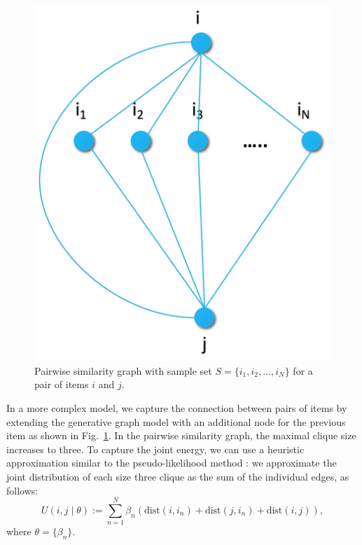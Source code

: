 \begin{figure}
\centerline{
  \includegraphics[scale=.2]{i2i_joined.png}}

\caption[]{Pairwise similarity graph with sample set $S=\{i_1,i_2,...,i_{N}\}$ for a pair of items $i$ and $j$.}
\label{fig:join}
\end{figure}


In a more complex model, we capture the connection between pairs of items by extending the generative graph model with an additional node for the previous item as shown in Fig.~\ref{fig:join}.  In the pairwise similarity graph, the maximal clique size increases to three. To capture the joint energy, we can use a heuristic approximation similar to the pseudo-likelihood method \cite{besag1975statistical}: we approximate the joint distribution of each size three clique as the sum of the individual edges, as follows:
%
\begin{equation}
\label{eq:potential_joined}
U(i,j \mid \theta) := \sum_{n=1}^{N} \beta_{n} (\mbox{dist}(i,i_n) + \mbox{dist}(j,i_n) + \mbox{dist}(i,j)),
\end{equation}
%
where $\theta = \{\beta_n\}$.

